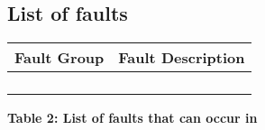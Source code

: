 \subsection{List of faults}
\begin{table}[H]
	\begin{center}
		\begin{tabular}{|p{6 cm}|p{8 cm}|}
			\hline
			\textbf{Fault Group} & \textbf{Fault Description}\\
			\hline
			&   \\
			\hline
			&  \\
			\hline
			&  \\
			\hline
			&  \\
			\hline
			
		\end{tabular}
		\begin{center}
			\textbf{Table 2: List of faults that can occur in }
		\end{center}
	\end{center}
\end{table}
